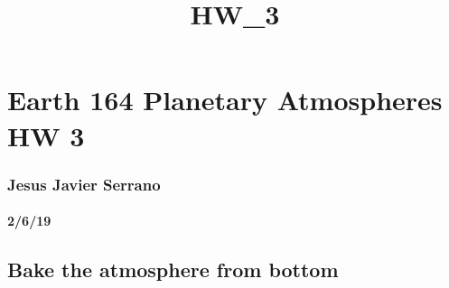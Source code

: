 \documentclass[11pt]{article}
\title{HW\_3}
\begin{document}
    
    
    \maketitle
    
    

    
    \section{Earth 164 Planetary Atmospheres HW
3}\label{earth-164-planetary-atmospheres-hw-3}

\subsubsection{Jesus Javier Serrano}\label{jesus-javier-serrano}

\paragraph{2/6/19}\label{section}

\subsection{Bake the atmosphere from
bottom}\label{bake-the-atmosphere-from-bottom}
\end{document}
